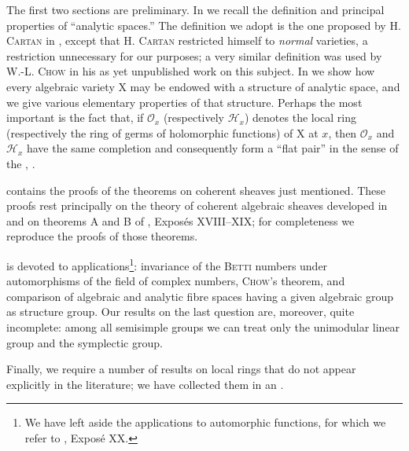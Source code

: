 The first two sections are preliminary. In  we recall the definition and principal properties of ``analytic spaces.'' The definition we adopt is the one proposed by H. \textsc{Cartan} in , except that H. \textsc{Cartan} restricted himself to \textit{normal} varieties, a restriction unnecessary for our purposes; a very similar definition was used by W.-L. \textsc{Chow} in his as yet unpublished work on this subject. In  we show how every algebraic variety $\mathrm{X}$ may be endowed with a structure of analytic space, and we give various elementary properties of that structure. Perhaps the most important is the fact that, if $\mathcal{O}_x$ (respectively $\mathcal{H}_x$) denotes the local ring (respectively the ring of germs of holomorphic functions) of $\mathrm{X}$ at $x$, then $\mathcal{O}_x$ and $\mathcal{H}_x$ have the same completion and consequently form a ``flat pair'' in the sense of the , .

 contains the proofs of the theorems on coherent sheaves just mentioned. These proofs rest principally on the theory of coherent algebraic sheaves developed in  and on theorems A and B of , Expos\'es XVIII--XIX; for completeness we reproduce the proofs of those theorems.

 is devoted to applications\footnote{We have left aside the applications to automorphic functions, for which we refer to , Expos\'e XX.}: invariance of the \textsc{Betti} numbers under automorphisms of the field of complex numbers, \textsc{Chow}'s theorem, and comparison of algebraic and analytic fibre spaces having a given algebraic group as structure group. Our results on the last question are, moreover, quite incomplete: among all semisimple groups we can treat only the unimodular linear group and the symplectic group.

Finally, we require a number of results on local rings that do not appear explicitly in the literature; we have collected them in an .
